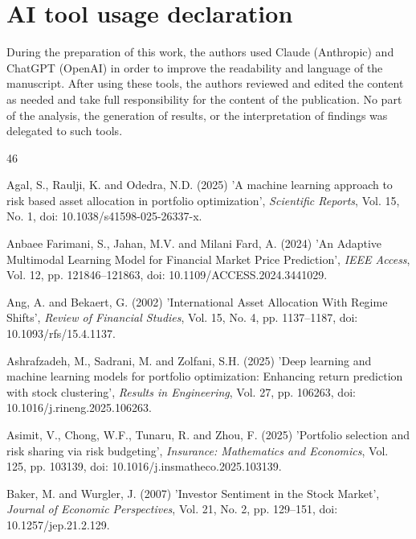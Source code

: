 \documentclass{singlecol-new}
\theoremstyle{TH}{
\newtheorem{lemma}{Lemma}
\newtheorem{theorem}[lemma]{Theorem}
\newtheorem{corrolary}[lemma]{Corrolary}
\newtheorem{conjecture}[lemma]{Conjecture}
\newtheorem{proposition}[lemma]{Proposition}
\newtheorem{claim}[lemma]{Claim}
\newtheorem{stheorem}[lemma]{Wrong Theorem}
\newtheorem{algorithm}{Algorithm}
}
\theoremstyle{THrm}{
\newtheorem{definition}{Definition}[section]
\newtheorem{question}{Question}[section]
\newtheorem{remark}{Remark}
\newtheorem{scheme}{Scheme}
}
\theoremstyle{THhit}{
\newtheorem{case}{Case}[section]
}
\begin{document}
\section*{AI tool usage declaration}
During the preparation of this work, the authors used Claude (Anthropic) and ChatGPT
(OpenAI) in order to improve the readability and language of the manuscript. After
using these tools, the authors reviewed and edited the content as needed and take full
responsibility for the content of the publication. No part of the analysis, the
generation of results, or the interpretation of findings was delegated to such tools.

\label{sec:refs}
\begin{thebibliography}{46}

Agal, S., Raulji, K. and Odedra, N.D. (2025) 'A machine learning approach to risk based asset allocation in portfolio optimization', {\it Scientific Reports}, Vol. 15, No. 1, doi: 10.1038/s41598-025-26337-x.

Anbaee Farimani, S., Jahan, M.V. and Milani Fard, A. (2024) 'An Adaptive Multimodal Learning Model for Financial Market Price Prediction', {\it IEEE Access}, Vol. 12, pp. 121846--121863, doi: 10.1109/ACCESS.2024.3441029.

Ang, A. and Bekaert, G. (2002) 'International Asset Allocation With Regime Shifts', {\it Review of Financial Studies}, Vol. 15, No. 4, pp. 1137--1187, doi: 10.1093/rfs/15.4.1137.

Ashrafzadeh, M., Sadrani, M. and Zolfani, S.H. (2025) 'Deep learning and machine learning models for portfolio optimization: Enhancing return prediction with stock clustering', {\it Results in Engineering}, Vol. 27, pp. 106263, doi: 10.1016/j.rineng.2025.106263.

Asimit, V., Chong, W.F., Tunaru, R. and Zhou, F. (2025) 'Portfolio selection and risk sharing via risk budgeting', {\it Insurance: Mathematics and Economics}, Vol. 125, pp. 103139, doi: 10.1016/j.insmatheco.2025.103139.

Baker, M. and Wurgler, J. (2007) 'Investor Sentiment in the Stock Market', {\it Journal of Economic Perspectives}, Vol. 21, No. 2, pp. 129--151, doi: 10.1257/jep.21.2.129.


\end{thebibliography}
\end{document}
